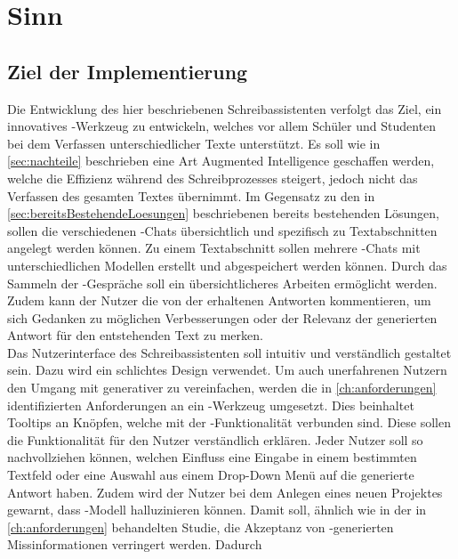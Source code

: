 \documentclass[../main.tex]{subfiles}
\begin{document}
\section{Sinn}

\subsection{Ziel der Implementierung}

Die Entwicklung des hier beschriebenen Schreibassistenten verfolgt das Ziel, ein innovatives -Werkzeug zu entwickeln, welches vor allem Schüler und Studenten bei dem Verfassen 
unterschiedlicher Texte unterstützt. Es soll wie in \autoref{sec:nachteile} beschrieben eine Art Augmented Intelligence geschaffen werden, welche die Effizienz während des Schreibprozesses 
steigert, jedoch nicht das Verfassen des gesamten Textes übernimmt. Im Gegensatz zu den in \autoref{sec:bereitsBestehendeLoesungen} beschriebenen bereits bestehenden Lösungen, sollen die verschiedenen -Chats 
übersichtlich und spezifisch zu Textabschnitten angelegt werden können. Zu einem Textabschnitt sollen mehrere -Chats mit unterschiedlichen Modellen erstellt und abgespeichert 
werden können. Durch das Sammeln der -Gespräche soll ein übersichtlicheres Arbeiten ermöglicht werden. Zudem kann der Nutzer die von der  erhaltenen Antworten kommentieren, um 
sich Gedanken zu möglichen Verbesserungen oder der Relevanz der generierten Antwort für den entstehenden Text zu merken.\\
Das Nutzerinterface des Schreibassistenten soll intuitiv und verständlich gestaltet sein. Dazu wird ein schlichtes Design verwendet. Um auch unerfahrenen Nutzern den Umgang mit 
generativer  zu vereinfachen, werden die in \autoref{ch:anforderungen} identifizierten Anforderungen an ein -Werkzeug umgesetzt. Dies beinhaltet Tooltips an Knöpfen, welche mit der 
-Funktionalität verbunden sind. Diese sollen die Funktionalität für den Nutzer verständlich erklären. Jeder Nutzer soll so nachvollziehen können, welchen Einfluss eine Eingabe in 
einem bestimmten Textfeld oder eine Auswahl aus einem Drop-Down Menü auf die generierte Antwort haben. Zudem wird der Nutzer bei dem Anlegen eines neuen Projektes gewarnt, dass 
-Modell halluzinieren können. Damit soll, ähnlich wie in der in \autoref{ch:anforderungen} behandelten Studie, die Akzeptanz von -generierten Missinformationen verringert werden. Dadurch 
\end{document}
